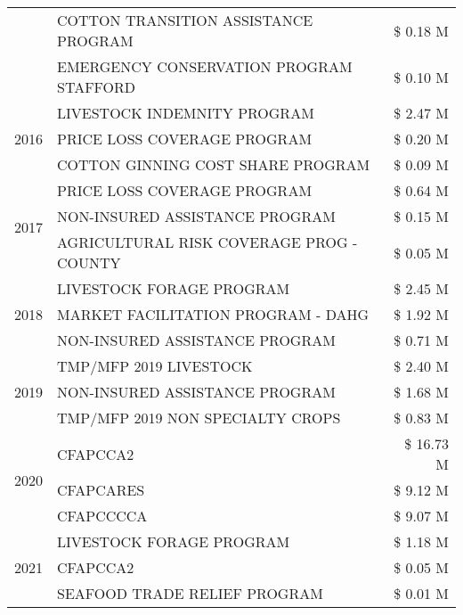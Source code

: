 \begin{tabular}{llr}
 & COTTON TRANSITION ASSISTANCE PROGRAM & \$ 0.18 M \\
 & EMERGENCY CONSERVATION PROGRAM STAFFORD & \$ 0.10 M \\
\cline{1-3}
\multirow[t]{3}{*}{2016} & LIVESTOCK INDEMNITY PROGRAM & \$ 2.47 M \\
 & PRICE LOSS COVERAGE PROGRAM & \$ 0.20 M \\
 & COTTON GINNING COST SHARE PROGRAM & \$ 0.09 M \\
\cline{1-3}
\multirow[t]{3}{*}{2017} & PRICE LOSS COVERAGE PROGRAM & \$ 0.64 M \\
 & NON-INSURED ASSISTANCE PROGRAM & \$ 0.15 M \\
 & AGRICULTURAL RISK COVERAGE PROG - COUNTY & \$ 0.05 M \\
\cline{1-3}
\multirow[t]{3}{*}{2018} & LIVESTOCK FORAGE PROGRAM & \$ 2.45 M \\
 & MARKET FACILITATION PROGRAM - DAHG & \$ 1.92 M \\
 & NON-INSURED ASSISTANCE PROGRAM & \$ 0.71 M \\
\cline{1-3}
\multirow[t]{3}{*}{2019} & TMP/MFP 2019 LIVESTOCK & \$ 2.40 M \\
 & NON-INSURED ASSISTANCE PROGRAM & \$ 1.68 M \\
 & TMP/MFP 2019 NON SPECIALTY CROPS & \$ 0.83 M \\
\cline{1-3}
\multirow[t]{3}{*}{2020} & CFAPCCA2 & \$ 16.73 M \\
 & CFAPCARES & \$ 9.12 M \\
 & CFAPCCCCA & \$ 9.07 M \\
\cline{1-3}
\multirow[t]{3}{*}{2021} & LIVESTOCK FORAGE PROGRAM & \$ 1.18 M \\
 & CFAPCCA2 & \$ 0.05 M \\
 & SEAFOOD TRADE RELIEF PROGRAM & \$ 0.01 M \\
\cline{1-3}
\bottomrule
\end{tabular}
